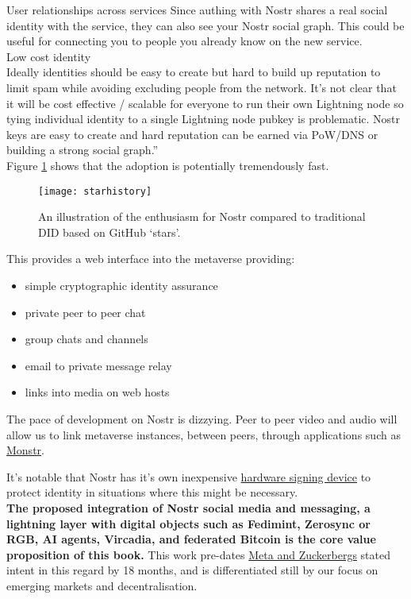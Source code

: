 {User relationships across services
Since authing with Nostr shares a real social identity with the service, they can also see your Nostr social graph. This could be useful for connecting you to people you already know on the new service.\\
Low cost identity\\
Ideally identities should be easy to create but hard to build up reputation to limit spam while avoiding excluding people from the network. It's not clear that it will be cost effective / scalable for everyone to run their own Lightning node so tying individual identity to a single Lightning node pubkey is problematic. Nostr keys are easy to create and hard reputation can be earned via PoW/DNS or building a strong social graph.''}\\
Figure \ref{fig:starhistory} shows that the adoption is potentially tremendously fast.
\begin{figure}
\texttt{[image: starhistory]}
  \caption{An illustration of the enthusiasm for Nostr compared to traditional DID based on GitHub `stars'.}
  \label{fig:starhistory}
\end{figure}
This provides a web interface into the metaverse providing:
\begin{itemize}
\item simple cryptographic identity assurance
\item private peer to peer chat
\item group chats and channels
\item email to private message relay
\item links into media on web hosts
\end{itemize}
The pace of development on Nostr is dizzying. Peer to peer video and audio will allow us to link metaverse instances, between peers, through applications such as \href{https://monstr.app/}{Monstr}.\par
It's notable that Nostr has it's own inexpensive \href{https://github.com/lnbits/nostr-signing-device}{hardware signing device} to protect identity in situations where this might be necessary.\\
\textbf{The proposed integration of Nostr social media and messaging, a lightning layer with digital objects such as Fedimint, Zerosync or RGB, AI agents, Vircadia, and federated Bitcoin is the core value proposition of this
book.} This work pre-dates \href{https://www.theverge.com/2023/4/26/23699633/mark-zuckerberg-meta-generative-ai-chatbots-instagram-facebook-whatsapp}{Meta and Zuckerbergs} stated intent in this regard by 18 months, and is differentiated still by our focus on emerging markets and decentralisation.
